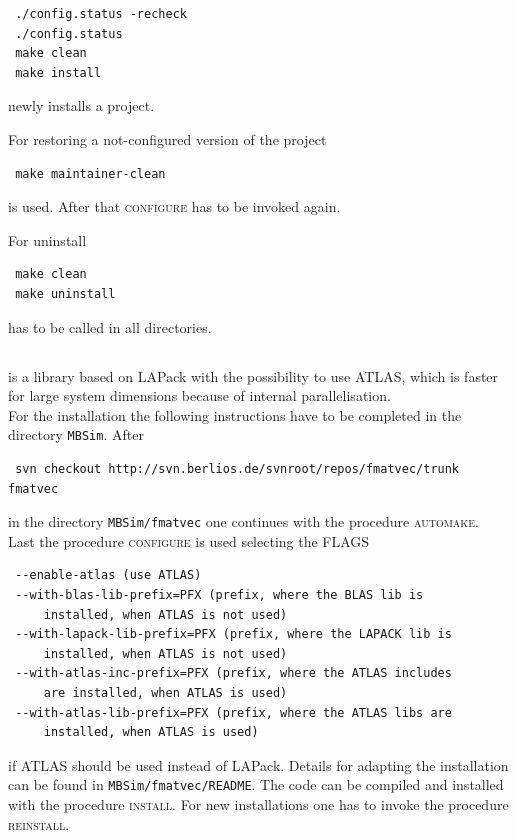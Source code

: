 \begin{verbatim}
 ./config.status -recheck
 ./config.status
 make clean
 make install
\end{verbatim}
newly installs a project.\par
For restoring a not-configured version of the project
\begin{verbatim}
 make maintainer-clean
\end{verbatim}
is used. After that \textsc{configure} has to be invoked again.\par 
For uninstall
\begin{verbatim}
 make clean
 make uninstall
\end{verbatim}
has to be called in all directories.

\subsection{\FMatVec{}}
\FMatVec{} is a library based on LAPack with the possibility to use ATLAS, which is faster for large system dimensions because of internal parallelisation.\\
For the installation the following instructions have to be completed in the directory \texttt{MBSim}. After
\begin{verbatim}
 svn checkout http://svn.berlios.de/svnroot/repos/fmatvec/trunk fmatvec
\end{verbatim}
in the directory \texttt{MBSim/fmatvec} one continues with the procedure \textsc{automake}.\\
Last the procedure \textsc{configure} is used selecting the FLAGS
\begin{verbatim}
 --enable-atlas (use ATLAS)
 --with-blas-lib-prefix=PFX (prefix, where the BLAS lib is
     installed, when ATLAS is not used)
 --with-lapack-lib-prefix=PFX (prefix, where the LAPACK lib is
     installed, when ATLAS is not used)
 --with-atlas-inc-prefix=PFX (prefix, where the ATLAS includes 
     are installed, when ATLAS is used)
 --with-atlas-lib-prefix=PFX (prefix, where the ATLAS libs are
     installed, when ATLAS is used)
\end{verbatim}
if ATLAS should be used instead of LAPack. Details for adapting the installation can be found in \texttt{MBSim/fmatvec/README}. The code can be compiled and installed with the procedure \textsc{install}. For new installations one has to invoke the procedure \textsc{reinstall}.

